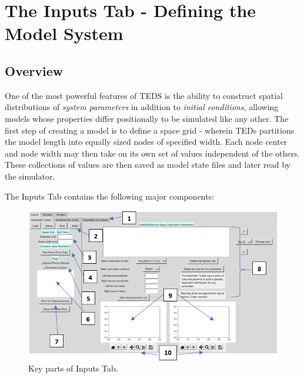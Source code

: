 \documentclass[11pt,letterpaper,titlepage]{article}
\begin{document}
	\newpage
	\section{The Inputs Tab - Defining the Model System}
		\subsection{Overview}
		    \par
		    One of the most powerful features of TEDS is the ability to construct spatial distributions of \textit{system parameters} in addition to \textit{initial conditions}, allowing models whose properties differ positionally to be simulated like any other. The first step of creating a model is to define a space grid - wherein TEDs partitions the model length into equally sized nodes of specified width. Each node center and node width may then take on its own set of values independent of the others. These collections of values are then saved as model state files and later read by the simulator.
			\par
			The Inputs Tab contains the following major components:
			
			\begin{figure}[H]
				\label{fig:labeled_main_interface}
				\centering
				\includegraphics[scale=1]{"labeled_main_interface"}
				\caption{Key parts of Inputs Tab.}
			\end{figure}
		
\end{document}
